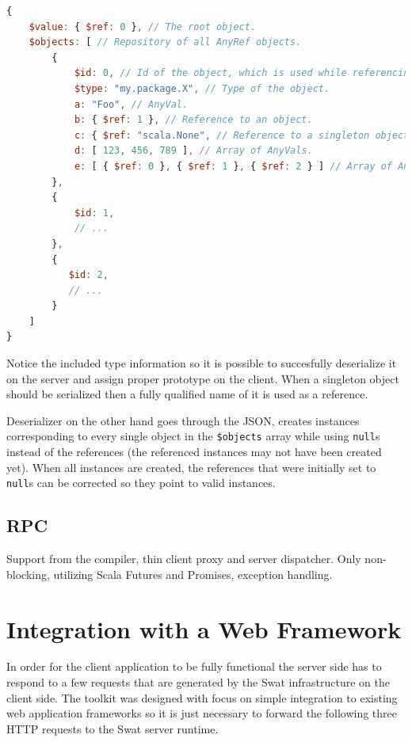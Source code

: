 \documentclass[12pt,a4paper]{report}
\begin{document}
\begin{minipage}{\linewidth}
\begin{lstlisting}[language=JavaScript,caption={A serialized object that references other objects.},label={lst:Serialization},basicstyle=\scriptsize\ttfamily]
{
    $value: { $ref: 0 }, // The root object.
    $objects: [ // Repository of all AnyRef objects.
        {
            $id: 0, // Id of the object, which is used while referencing it.
            $type: "my.package.X", // Type of the object.
            a: "Foo", // AnyVal.
            b: { $ref: 1 }, // Reference to an object.
            c: { $ref: "scala.None", // Reference to a singleton object.
            d: [ 123, 456, 789 ], // Array of AnyVals.
            e: [ { $ref: 0 }, { $ref: 1 }, { $ref: 2 } ] // Array of AnyRefs.
        },
        {
            $id: 1,
            // ...
        },
        {
           $id: 2,
           // ...
        }
    ]
}
\end{lstlisting}
\end{minipage}

Notice the included type information so it is possible to succesfully deserialize it on the server and assign proper prototype on the client. When a singleton object should be serialized then a fully qualified name of it is used as a reference.

Deserializer on the other hand goes through the JSON, creates instances corresponding to every single object in the \texttt{\$objects} array while using \texttt{null}s instead of the references (the referenced instances may not have been created yet). When all instances are created, the references that were initially set to \texttt{null}s can be corrected so they point to valid instances.

\subsection{RPC}

Support from the compiler, thin client proxy and server dispatcher. Only non-blocking, utilizing Scala Futures and Promises, exception handling.

\section{Integration with a Web Framework}

In order for the client application to be fully functional the server side has to respond to a few requests that are generated by the Swat infrastructure on the client side. The toolkit was designed with focus on simple integration to existing web application frameworks so it is just necessary to forward the following three HTTP requests to the Swat server runtime.
\end{document}
